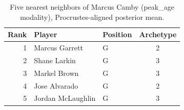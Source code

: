 \begin{table}[htbp]
  \centering\small
  \begin{tabular}{rllc}
    \toprule
    Rank & Player & Position & Archetype \\
    \midrule
    1 & Marcus Garrett & G & 2 \\
    2 & Shane Larkin & G & 3 \\
    3 & Markel Brown & G & 3 \\
    4 & Jose Alvarado & G & 2 \\
    5 & Jordan McLaughlin & G & 3 \\
    \bottomrule
  \end{tabular}
  \caption{Five nearest neighbors of Marcus Camby (peak_age modality), Procrustes-aligned posterior mean.}
  \label{tab:Marcus_Camby_neighbors_peak_age}
\end{table}

